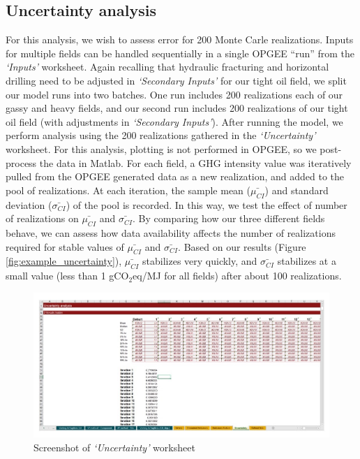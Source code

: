 \documentclass[11pt]{report}
\newcommand{\sheet}[1]{\textit{`{#1}'}}
\begin{document}
\clearpage

\subsection{Uncertainty analysis} 

For this analysis, we wish to assess error for 200 Monte Carle realizations. Inputs for multiple fields can be handled sequentially in a single OPGEE ``run'' from the \sheet{Inputs} worksheet. Again recalling that hydraulic fracturing and horizontal drilling need to be adjusted in \sheet{Secondary Inputs} for our tight oil field, we split our model runs into two batches. One run includes 200 realizations each of our gassy and heavy fields, and our second run includes 200 realizations of our tight oil field (with adjustments in \sheet{Secondary Inputs}).
After running the model, we perform analysis using the 200 realizations gathered in the \sheet{Uncertainty} worksheet. For this analysis, plotting is not performed in OPGEE, so we post-process the data in Matlab. For each field, a GHG intensity value was iteratively pulled from the OPGEE generated data as a new realization, and added to the pool of realizations. At each iteration, the sample mean ($\bar{\mu_{CI}}$) and standard deviation ($\bar{\sigma_{CI}}$) of the pool is recorded. In this way, we test the effect of number of realizations on $\bar{\mu_{CI}}$ and $\bar{\sigma_{CI}}$. By comparing how our three different fields behave, we can assess how data availability affects the number of realizations required for stable values of $\bar{\mu_{CI}}$ and $\bar{\sigma_{CI}}$. Based on our results (Figure \ref{fig:example_uncertainty}), $\bar{\mu_{CI}}$ stabilizes very quickly, and $\bar{\sigma_{CI}}$ stabilizes at a small value (less than 1 gCO$_2$eq/MJ for all fields) after about 100 realizations.

\begin{figure}[h]
\includegraphics[width=1\columnwidth]{documentation/images/User_Guide_figs/uncertaintypage_2.jpg}
\caption{Screenshot of \sheet{Uncertainty} worksheet}
\label{fig:uncertaintypage}
\end{figure}
\end{document}
